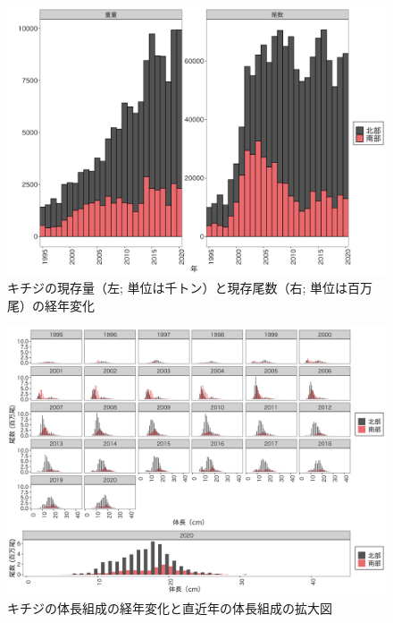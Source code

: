 \documentclass[11pt]{article} %
\begin{document}
\begin{linenumbers}
\begin{figure}[h]
  \centering
  \includegraphics[width = 14cm]{キチジtrend.png}
  \caption{キチジの現存量（左; 単位は千トン）と現存尾数（右; 単位は百万尾）の経年変化}
\end{figure}

\begin{figure}[h]
  \centering
  \includegraphics[width = 14cm]{キチジlength.png}
  \caption{キチジの体長組成の経年変化と直近年の体長組成の拡大図}
\end{figure}


\end{linenumbers}
\end{document}
